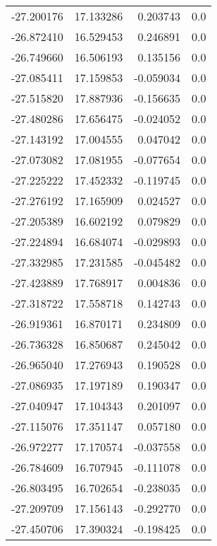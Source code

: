 \begin{tabular}{rrrr}
      -27.200176 &        17.133286 &    0.203743 &   0.0 \\
      -26.872410 &        16.529453 &    0.246891 &   0.0 \\
      -26.749660 &        16.506193 &    0.135156 &   0.0 \\
      -27.085411 &        17.159853 &   -0.059034 &   0.0 \\
      -27.515820 &        17.887936 &   -0.156635 &   0.0 \\
      -27.480286 &        17.656475 &   -0.024052 &   0.0 \\
      -27.143192 &        17.004555 &    0.047042 &   0.0 \\
      -27.073082 &        17.081955 &   -0.077654 &   0.0 \\
      -27.225222 &        17.452332 &   -0.119745 &   0.0 \\
      -27.276192 &        17.165909 &    0.024527 &   0.0 \\
      -27.205389 &        16.602192 &    0.079829 &   0.0 \\
      -27.224894 &        16.684074 &   -0.029893 &   0.0 \\
      -27.332985 &        17.231585 &   -0.045482 &   0.0 \\
      -27.423889 &        17.768917 &    0.004836 &   0.0 \\
      -27.318722 &        17.558718 &    0.142743 &   0.0 \\
      -26.919361 &        16.870171 &    0.234809 &   0.0 \\
      -26.736328 &        16.850687 &    0.245042 &   0.0 \\
      -26.965040 &        17.276943 &    0.190528 &   0.0 \\
      -27.086935 &        17.197189 &    0.190347 &   0.0 \\
      -27.040947 &        17.104343 &    0.201097 &   0.0 \\
      -27.115076 &        17.351147 &    0.057180 &   0.0 \\
      -26.972277 &        17.170574 &   -0.037558 &   0.0 \\
      -26.784609 &        16.707945 &   -0.111078 &   0.0 \\
      -26.803495 &        16.702654 &   -0.238035 &   0.0 \\
      -27.209709 &        17.156143 &   -0.292770 &   0.0 \\
      -27.450706 &        17.390324 &   -0.198425 &   0.0 \\

\end{tabular}
